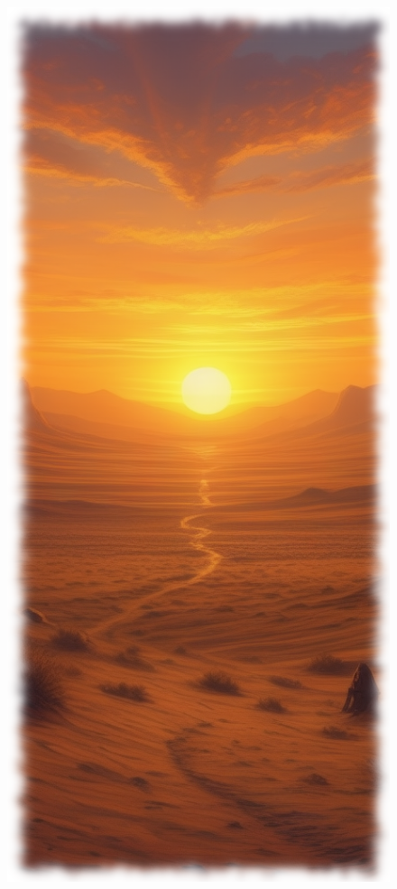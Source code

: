 \vspace{6em}

\begin{figure}[h]
\begin{center}
\includegraphics[scale=0.48]{img/ai-images/desert-sunset.png}
\end{center}
\end{figure}
